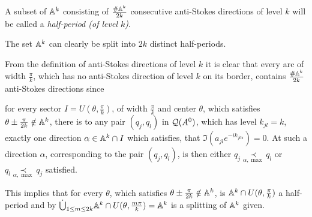 \begin{defn}
  A subset of $\mathbb{A}^k$ consisting of $\frac{\#\mathbb{A}^k}{2k}$ consecutive anti-Stokes
  directions of level $k$ will be called a \emph{half-period (of level $k$)}.
  \begin{s-rem}
    The set $\mathbb{A}^k$ can clearly be split into $2k$ distinct half-periods.
  \end{s-rem}
\end{defn}
From the definition of anti-Stokes directions of level $k$ it is clear that 
every arc of width $\frac{\pi}{k}$, which has no anti-Stokes direction of level
$k$ on its border, contains $\frac{\#\mathbb{A}^k}{2k}$ anti-Stokes directions
since
\begin{einr}
  for every sector $I=U(\theta,\frac{\pi}{k})$, of width $\frac{\pi}{k}$ and
  center $\theta$, which satisfies $\theta\pm\frac{\pi}{2k}\notin\mathbb{A}^k$,
  there is to any pair $(q_j,q_l)$ in $\mathcal{Q}(A^0)$, which has level $k_{jl}=k$,
  exactly one direction $\alpha\in \mathbb{A}^k\cap I$ which satisfies, that
  $\Im(a_{jl}e^{-ik_{jl\alpha}})=0$.
  At such a direction $\alpha$, corresponding to the pair $(q_j,q_l)$, is then
  either $q_j\underset{\alpha,\max}{\prec}q_l$ or
  $q_l\underset{\alpha,\max}{\prec}q_j$ satisfied.
\end{einr}
This implies that for every $\theta$, which satisfies
$\theta\pm\frac{\pi}{2k}\notin\mathbb{A}^k$, is $\mathbb{A}^k\cap U(\theta,\frac{\pi}{k})$
a half-period and by
$\dot\bigcup_{1\leq m\leq 2k}\mathbb{A}^k\cap U(\theta,\frac{m\pi}{k})=\mathbb{A}^k$ is a
splitting of $\mathbb{A}^k$ given.

\begin{comment}
  We know that
  \[
    \prod_{\alpha\in\A}\SSto_{\alpha}^{k}(A^0)\cong
    \prod_{\alpha\in\A^k}\SSto_{\alpha}^{k}(A^0) \,,
  \]
  since $\SSto_{\alpha}^{k}(A^0)=\{\id\}$ when $k\notin\cK_\alpha$.
\end{comment}

